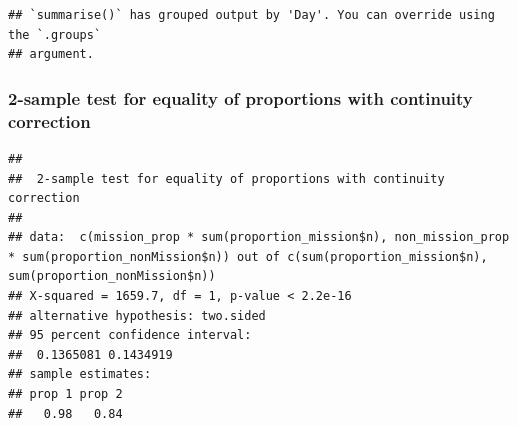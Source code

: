 \documentclass[
]{article}
\begin{document}
\begin{verbatim}
## `summarise()` has grouped output by 'Day'. You can override using the `.groups`
## argument.
\end{verbatim}

\subsubsection{2-sample test for equality of proportions with continuity
correction}\label{sample-test-for-equality-of-proportions-with-continuity-correction}

\begin{verbatim}
## 
##  2-sample test for equality of proportions with continuity correction
## 
## data:  c(mission_prop * sum(proportion_mission$n), non_mission_prop * sum(proportion_nonMission$n)) out of c(sum(proportion_mission$n), sum(proportion_nonMission$n))
## X-squared = 1659.7, df = 1, p-value < 2.2e-16
## alternative hypothesis: two.sided
## 95 percent confidence interval:
##  0.1365081 0.1434919
## sample estimates:
## prop 1 prop 2 
##   0.98   0.84
\end{verbatim}
\end{document}
